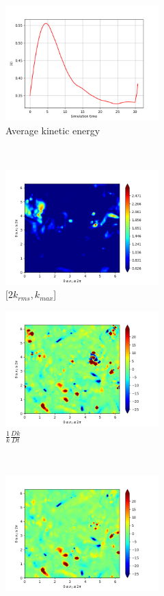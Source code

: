 \begin{figure}[H]
    \begin{subfigure}[H]{0.45\textwidth}
        \includegraphics[height=1.75in]{media/run-cds-65/ke-average1400.png}
        \caption{Average kinetic energy}
    \end{subfigure}
    ~
    \begin{subfigure}[H]{0.45\textwidth}
        \includegraphics[height=1.75in]{media/run-cds-65/ke-2-1400.png}
        \caption{$[2k_{rms}, k_{max} $] }
    \end{subfigure}
    \newline
    \begin{subfigure}[H]{0.45\textwidth}
        \includegraphics[height=1.75in]{media/run-cds-65/ke-1400.png}
        \caption{$\frac{1}{k} \frac{D k}{Dt}$}
    \end{subfigure}
    ~
    \begin{subfigure}{0.45\textwidth}
        \includegraphics[height=1.75in]{media/run-cds-65/A-ke-1400.png}

\end{subfigure}
\end{figure}
